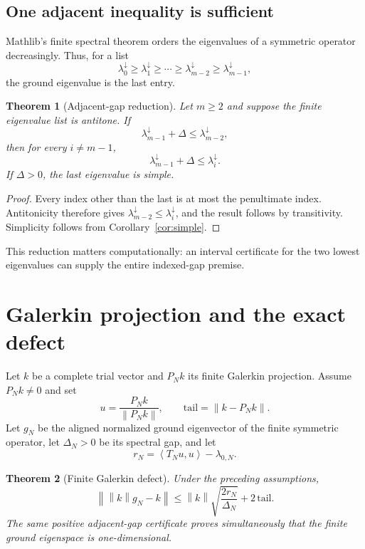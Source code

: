 \documentclass[11pt]{article}
\newtheorem{theorem}{Theorem}[section]
\theoremstyle{definition}
\newcommand{\ip}[2]{\left\langle #1,#2\right\rangle}
\newcommand{\norm}[1]{\left\lVert #1\right\rVert}
\begin{document}
\subsection{One adjacent inequality is sufficient}

Mathlib's finite spectral theorem orders the eigenvalues of a symmetric
operator decreasingly.  Thus, for a list
\[
 \lambda_0^{\downarrow}\geq\lambda_1^{\downarrow}\geq\cdots
 \geq\lambda_{m-2}^{\downarrow}\geq\lambda_{m-1}^{\downarrow},
\]
the ground eigenvalue is the last entry.

\begin{theorem}[Adjacent-gap reduction]\label{thm:adjacent}
Let $m\geq2$ and suppose the finite eigenvalue list is antitone.  If
\[
 \lambda_{m-1}^{\downarrow}+\Delta
 \leq\lambda_{m-2}^{\downarrow},
\]
then for every $i\neq m-1$,
\[
 \lambda_{m-1}^{\downarrow}+\Delta
 \leq\lambda_i^{\downarrow}.
\]
If $\Delta>0$, the last eigenvalue is simple.
\end{theorem}

\begin{proof}
Every index other than the last is at most the penultimate index.  Antitonicity
therefore gives
$\lambda_{m-2}^{\downarrow}\leq\lambda_i^{\downarrow}$, and the result follows
by transitivity.  Simplicity follows from Corollary~\ref{cor:simple}.
\end{proof}

This reduction matters computationally: an interval certificate for the two
lowest eigenvalues can supply the entire indexed-gap premise.

\section{Galerkin projection and the exact defect}

Let $k$ be a complete trial vector and $P_Nk$ its finite Galerkin projection.
Assume $P_Nk\neq0$ and set
\[
 u=\frac{P_Nk}{\norm{P_Nk}},
 \qquad
 \mathrm{tail}=\norm{k-P_Nk}.
\]
Let $g_N$ be the aligned normalized ground eigenvector of the finite symmetric
operator, let $\Delta_N>0$ be its spectral gap, and let
\[
 r_N=\ip{T_Nu}{u}-\lambda_{0,N}.
\]

\begin{theorem}[Finite Galerkin defect]\label{thm:galerkin}
Under the preceding assumptions,
\[
 \norm{\norm{k}g_N-k}
 \leq
 \norm{k}\sqrt{\frac{2r_N}{\Delta_N}}
 +2\,\mathrm{tail}.
\]
The same positive adjacent-gap certificate proves simultaneously that the
finite ground eigenspace is one-dimensional.
\end{theorem}
\end{document}
